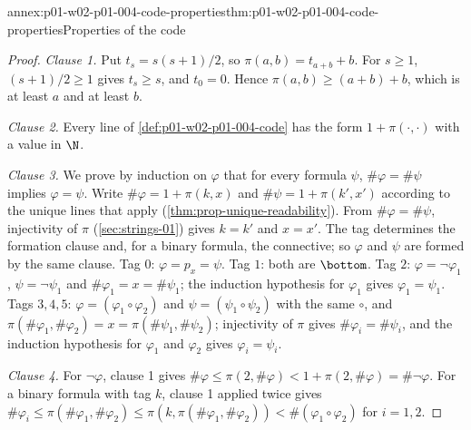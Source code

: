 \begin{annexitem}{annex:p01-w02-p01-004-code-properties}{thm:p01-w02-p01-004-code-properties}{Properties of the code}
\begin{proof}
\emph{Clause 1.} Put \(t_s=s(s+1)/2\), so \(\pi(a,b)=t_{a+b}+b\). For
\(s\ge1\), \((s+1)/2\ge1\) gives \(t_s\ge s\), and \(t_0=0\). Hence
\(\pi(a,b)\ge(a+b)+b\), which is at least \(a\) and at least \(b\).

\emph{Clause 2.} Every line of \cref{def:p01-w02-p01-004-code} has the form
\(1+\pi(\cdot,\cdot)\) with a value in \(\N\).

\emph{Clause 3.} We prove by induction on \(\varphi\) that for every formula
\(\psi\), \(\#\varphi=\#\psi\) implies \(\varphi=\psi\). Write
\(\#\varphi=1+\pi(k,x)\) and \(\#\psi=1+\pi(k',x')\) according to the unique
lines that apply (\cref{thm:prop-unique-readability}). From
\(\#\varphi=\#\psi\), injectivity of \(\pi\) (\cref{sec:strings-01}) gives
\(k=k'\) and \(x=x'\). The tag determines the formation clause and, for a
binary formula, the connective; so \(\varphi\) and \(\psi\) are formed by the
same clause. Tag \(0\): \(\varphi=p_x=\psi\). Tag \(1\): both are \(\bottom\).
Tag \(2\): \(\varphi=\neg\varphi_1\), \(\psi=\neg\psi_1\) and
\(\#\varphi_1=x=\#\psi_1\); the induction hypothesis for \(\varphi_1\) gives
\(\varphi_1=\psi_1\). Tags \(3,4,5\): \(\varphi=(\varphi_1\circ\varphi_2)\)
and \(\psi=(\psi_1\circ\psi_2)\) with the same \(\circ\), and
\(\pi(\#\varphi_1,\#\varphi_2)=x=\pi(\#\psi_1,\#\psi_2)\); injectivity of
\(\pi\) gives \(\#\varphi_i=\#\psi_i\), and the induction hypothesis for
\(\varphi_1\) and \(\varphi_2\) gives \(\varphi_i=\psi_i\).

\emph{Clause 4.} For \(\neg\varphi\), clause 1 gives
\(\#\varphi\le\pi(2,\#\varphi)<1+\pi(2,\#\varphi)=\#\neg\varphi\). For a
binary formula with tag \(k\), clause 1 applied twice gives
\(\#\varphi_i\le\pi(\#\varphi_1,\#\varphi_2)\le\pi(k,\pi(\#\varphi_1,\#\varphi_2))
<\#(\varphi_1\circ\varphi_2)\) for \(i=1,2\).
\end{proof}
\end{annexitem}

